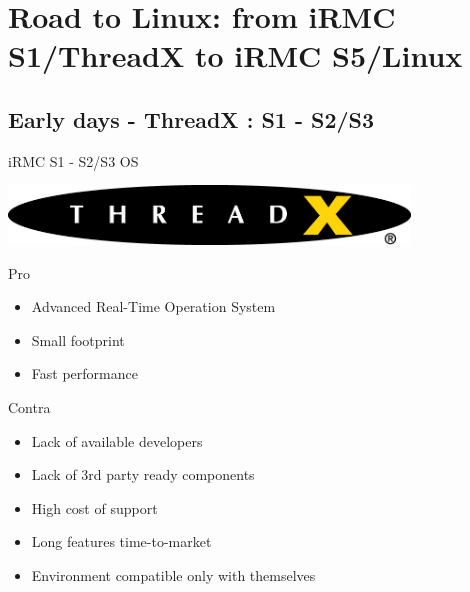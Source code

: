 \documentclass{beamer}
\begin{document}
\section{Road to Linux: from iRMC S1/ThreadX to iRMC S5/Linux}
  \subsection{Early days - ThreadX : S1 - S2/S3}
  \begin{frame}{iRMC S1 - S2/S3 OS}
	  \begin{center}
		  \includegraphics[width=0.8\textwidth]{logo/threadx.jpg}
	  \end{center}
	  \begin{block}{Pro}
		  \begin{itemize}
			  \item Advanced Real-Time Operation System
			  \item Small footprint
			  \item Fast performance
		  \end{itemize}
	  \end{block}
	  \pause
	  
	  \begin{block}{Contra}
		  \begin{itemize}
			  \item Lack of available developers
			  \item Lack of 3rd party ready components
			  \item High cost of support
			  \item Long features time-to-market
			  \item Environment compatible only with themselves
		  \end{itemize}
	  \end{block}

  \end{frame}
\end{document}
